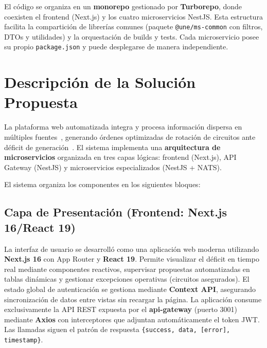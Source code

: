 El código se organiza en un \textbf{monorepo} gestionado por \textbf{Turborepo}, donde coexisten el frontend (Next.js) y los cuatro microservicios NestJS. Esta estructura facilita la compartición de librerías comunes (paquete \texttt{@une/ms-common} con filtros, DTOs y utilidades) y la orquestación de builds y tests. Cada microservicio posee su propio \texttt{package.json} y puede desplegarse de manera independiente.

\section{Descripción de la Solución Propuesta}

La plataforma web automatizada integra y procesa información dispersa en múltiples fuentes~\citep{villalba2021}, generando órdenes optimizadas de rotación de circuitos ante déficit de generación~\citep{gomez2016}. El sistema implementa una \textbf{arquitectura de microservicios} organizada en tres capas lógicas: frontend (Next.js), API Gateway (NestJS) y microservicios especializados (NestJS + NATS).



El sistema organiza los componentes en los siguientes bloques:

\subsection{Capa de Presentación (Frontend: Next.js 16/React 19)}
La interfaz de usuario se desarrolló como una aplicación web moderna utilizando \textbf{Next.js 16} con App Router y \textbf{React 19}. Permite visualizar el déficit en tiempo real mediante componentes reactivos, supervisar propuestas automatizadas en tablas dinámicas y gestionar excepciones operativas (circuitos asegurados). El estado global de autenticación se gestiona mediante \textbf{Context API}, asegurando sincronización de datos entre vistas sin recargar la página. La aplicación consume exclusivamente la API REST expuesta por el \textbf{api-gateway} (puerto 3001) mediante \textbf{Axios} con interceptores que adjuntan automáticamente el token JWT. Las llamadas siguen el patrón de respuesta \texttt{\{success, data, [error], timestamp\}}.

